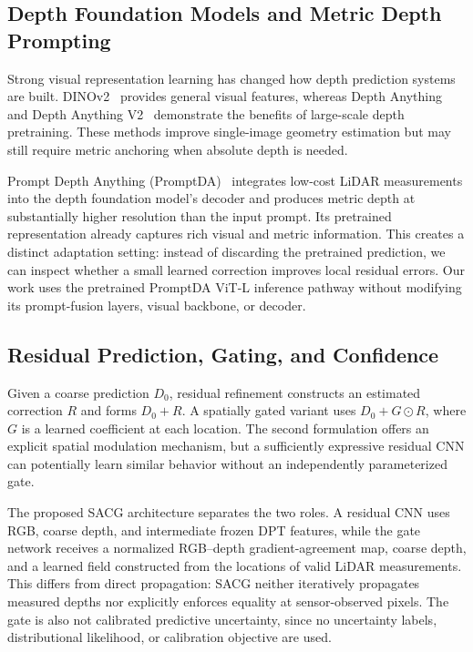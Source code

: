 \subsection{Depth Foundation Models and Metric Depth Prompting}
Strong visual representation learning has changed how depth prediction systems are built. DINOv2~\cite{oquab2024dinov2} provides general visual features, whereas Depth Anything~\cite{yang2024depthanything} and Depth Anything V2~\cite{yang2024depthanythingv2} demonstrate the benefits of large-scale depth pretraining. These methods improve single-image geometry estimation but may still require metric anchoring when absolute depth is needed.

Prompt Depth Anything (PromptDA)~\cite{lin2025promptda} integrates low-cost LiDAR measurements into the depth foundation model's decoder and produces metric depth at substantially higher resolution than the input prompt. Its pretrained representation already captures rich visual and metric information. This creates a distinct adaptation setting: instead of discarding the pretrained prediction, we can inspect whether a small learned correction improves local residual errors. Our work uses the pretrained PromptDA ViT-L inference pathway without modifying its prompt-fusion layers, visual backbone, or decoder.

\subsection{Residual Prediction, Gating, and Confidence}
Given a coarse prediction $D_0$, residual refinement constructs an estimated correction $R$ and forms $D_0+R$. A spatially gated variant uses $D_0+G\odot R$, where $G$ is a learned coefficient at each location. The second formulation offers an explicit spatial modulation mechanism, but a sufficiently expressive residual CNN can potentially learn similar behavior without an independently parameterized gate.

The proposed SACG architecture separates the two roles. A residual CNN uses RGB, coarse depth, and intermediate frozen DPT features, while the gate network receives a normalized RGB--depth gradient-agreement map, coarse depth, and a learned field constructed from the locations of valid LiDAR measurements. This differs from direct propagation: SACG neither iteratively propagates measured depths nor explicitly enforces equality at sensor-observed pixels. The gate is also not calibrated predictive uncertainty, since no uncertainty labels, distributional likelihood, or calibration objective are used.

